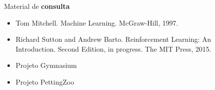 \documentclass{beamer}
\begin{document}
%	
%	
%	
%	
%
%
%
%
%
%
%
%

\begin{frame}{Material de \textbf{consulta}}
\begin{itemize}
  \item Tom Mitchell. Machine Learning. McGraw-Hill, 1997.
  \item Richard Sutton and Andrew Barto. Reinforcement Learning: An Introduction. Second Edition, in progress. The MIT Press, 2015.
  \item Projeto Gymnasium \href{https://gymnasium.farama.org/}{}
  \item Projeto PettingZoo \href{https://pettingzoo.farama.org/}{}
\end{itemize}
\end{frame}
\end{document}
